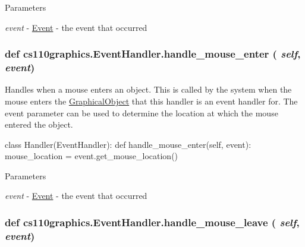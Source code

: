 \begin{DoxyParams}{Parameters}
\item[{\em event}]-\/ \hyperlink{classcs110graphics_1_1Event}{Event} -\/ the event that occurred \end{DoxyParams}
\hypertarget{classcs110graphics_1_1EventHandler_a13af3268f8a1aa36b8483eb2deffef15}{
\subsubsection[{handle\_\-mouse\_\-enter}]{\setlength{\rightskip}{0pt plus 5cm}def cs110graphics.EventHandler.handle\_\-mouse\_\-enter ( {\em self}, \/   {\em event})}}
\label{classcs110graphics_1_1EventHandler_a13af3268f8a1aa36b8483eb2deffef15}


Handles when a mouse enters an object. This is called by the system when the mouse enters the \hyperlink{classcs110graphics_1_1GraphicalObject}{GraphicalObject} that this handler is an event handler for. The event parameter can be used to determine the location at which the mouse entered the object. 
\begin{DoxyCode}
 class Handler(EventHandler):
     def handle_mouse_enter(self, event):
         mouse_location = event.get_mouse_location()
\end{DoxyCode}
 
\begin{DoxyParams}{Parameters}
\item[{\em event}]-\/ \hyperlink{classcs110graphics_1_1Event}{Event} -\/ the event that occurred \end{DoxyParams}
\hypertarget{classcs110graphics_1_1EventHandler_a5deaf2b6b8055e97ac0ddf6603132c64}{
\subsubsection[{handle\_\-mouse\_\-leave}]{\setlength{\rightskip}{0pt plus 5cm}def cs110graphics.EventHandler.handle\_\-mouse\_\-leave ( {\em self}, \/   {\em event})}}
\label{classcs110graphics_1_1EventHandler_a5deaf2b6b8055e97ac0ddf6603132c64}


